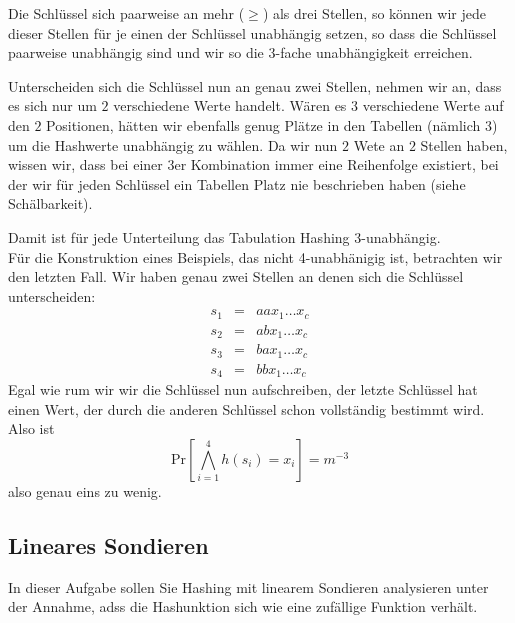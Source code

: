\documentclass[11pt,a4paper,ngerman]{article}
\newcommand{\prob}[1]{\text{Pr}\left[ #1 \right]}
\begin{document}
Die Schlüssel sich paarweise an mehr ($\geq$) als drei Stellen, so können wir jede dieser Stellen für je einen der Schlüssel unabhängig setzen, so dass
die Schlüssel paarweise unabhängig sind und wir so die $3$-fache unabhängigkeit erreichen.

Unterscheiden sich die Schlüssel nun an genau zwei Stellen, nehmen wir an, dass es sich nur um $2$ verschiedene Werte handelt. Wären es $3$ verschiedene Werte auf den $2$ Positionen, hätten wir ebenfalls genug Plätze in den Tabellen (nämlich 3) um die Hashwerte unabhängig zu wählen.
Da wir nun $2$ Wete an $2$ Stellen haben, wissen wir, dass bei einer 3er Kombination immer eine Reihenfolge existiert, bei der wir für jeden Schlüssel ein Tabellen Platz nie beschrieben haben (siehe Schälbarkeit).

Damit ist für jede Unterteilung das Tabulation Hashing 3-unabhängig.\\

Für die Konstruktion eines Beispiels, das nicht 4-unabhänigig ist, betrachten wir den letzten Fall. Wir haben genau zwei Stellen an denen sich die Schlüssel unterscheiden:
$$\begin{array}{rcl}
	s_1 &=& a a x_1 \ldots x_c\\
	s_2 &=& a b x_1 \ldots x_c\\
	s_3 &=& b a x_1 \ldots x_c\\
	s_4 &=& b b x_1 \ldots x_c
\end{array}$$
Egal wie rum wir wir die Schlüssel nun aufschreiben, der letzte Schlüssel hat einen Wert, der durch die anderen Schlüssel schon vollständig bestimmt wird.
Also ist 
$$
	\prob{\bigwedge_{i=1}^4 h(s_i) = x_i} = m^{-3}
$$
also genau eins zu wenig.

\subsection*{Lineares Sondieren}
In dieser Aufgabe sollen Sie Hashing mit linearem Sondieren analysieren unter der Annahme, adss die Hashunktion sich wie eine zufällige Funktion verhält.
\end{document}
